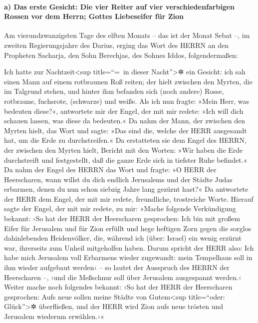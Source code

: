 \hypertarget{a-das-erste-gesicht-die-vier-reiter-auf-vier-verschiedenfarbigen-rossen-vor-dem-herrn-gottes-liebeseifer-fuxfcr-zion}{%
\paragraph{a) Das erste Gesicht: Die vier Reiter auf vier
verschiedenfarbigen Rossen vor dem Herrn; Gottes Liebeseifer für
Zion}\label{a-das-erste-gesicht-die-vier-reiter-auf-vier-verschiedenfarbigen-rossen-vor-dem-herrn-gottes-liebeseifer-fuxfcr-zion}}

 Am vierundzwanzigsten Tage des elften Monats -- das ist
der Monat Sebat --, im zweiten Regierungsjahre des Darius, erging das
Wort des HERRN an den Propheten Sacharja, den Sohn Berechjas, des Sohnes
Iddos, folgendermaßen:

 Ich hatte zur Nachtzeit\textless sup title=``=~in dieser
Nacht''\textgreater✲ ein Gesicht: ich sah einen Mann auf einem
rotbraunen Roß reiten; der hielt zwischen den Myrten, die im Talgrund
stehen, und hinter ihm befanden sich (noch andere) Rosse, rotbraune,
fuchsrote, (schwarze) und weiße.  Als ich nun fragte:
»Mein Herr, was bedeuten diese?«, antwortete mir der Engel, der mit mir
redete: »Ich will dich schauen lassen, was diese da bedeuten.«
 Da nahm der Mann, der zwischen den Myrten hielt, das
Wort und sagte: »Das sind die, welche der HERR ausgesandt hat, um die
Erde zu durchstreifen.«  Da erstatteten sie dem Engel des
HERRN, der zwischen den Myrten hielt, Bericht mit den Worten: »Wir haben
die Erde durchstreift und festgestellt, daß die ganze Erde sich in
tiefster Ruhe befindet.«  Da nahm der Engel des HERRN das
Wort und fragte: »O HERR der Heerscharen, wann willst du dich endlich
Jerusalems und der Städte Judas erbarmen, denen du nun schon siebzig
Jahre lang gezürnt hast?«  Da antwortete der HERR dem
Engel, der mit mir redete, freundliche, trostreiche Worte.
 Hierauf sagte der Engel, der mit mir redete, zu mir:
»Mache folgende Verkündigung bekannt: ›So hat der HERR der Heerscharen
gesprochen: Ich bin mit großem Eifer für Jerusalem und für Zion erfüllt
 und hege heftigen Zorn gegen die sorglos dahinlebenden
Heidenvölker, die, während ich (über: Israel) ein wenig erzürnt war,
ihrerseits zum Unheil mitgeholfen haben.  Darum spricht
der HERR also: Ich habe mich Jerusalem voll Erbarmens wieder zugewandt:
mein Tempelhaus soll in ihm wieder aufgebaut werden‹ -- so lautet der
Ausspruch des HERRN der Heerscharen --, ›und die Meßschnur soll über
Jerusalem ausgespannt werden.‹  Weiter mache noch
folgendes bekannt: ›So hat der HERR der Heerscharen gesprochen: Aufs
neue sollen meine Städte von Gutem\textless sup title=``oder:
Glück''\textgreater✲ überfließen, und der HERR wird Zion aufs neue
trösten und Jerusalem wiederum erwählen.‹«

